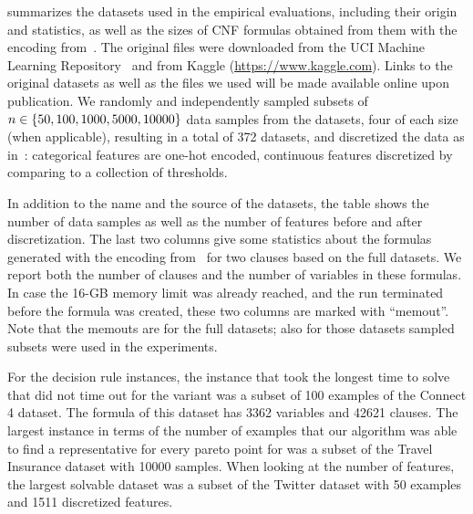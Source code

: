 
 summarizes the datasets used in the empirical evaluations, including their origin and statistics, as well as the sizes of CNF formulas obtained from them with the encoding from~\textcite{DBLP:conf/cp/MaliotovM18}.
The original files were downloaded from the UCI Machine Learning Repository~\autocite{UciMlr} and from Kaggle ({\small\url{https://www.kaggle.com}}).
Links to the original datasets as well as the files we used will be made available online upon publication.
We randomly and independently sampled subsets of $n\in\{50,100,1000,5000,10000\}$ data samples from the datasets, four of each size (when applicable), resulting in a         
total of 372 datasets, and discretized the data as in~\autocite{DBLP:conf/cp/MaliotovM18}:
categorical features are one-hot encoded, continuous features discretized by comparing to a collection of thresholds. 

In addition to the name and the source of the datasets, the table shows the number of data samples as well as the number of features before and after discretization.
The last two columns give some statistics about the formulas generated with the encoding from~\textcite{DBLP:conf/cp/MaliotovM18} for two clauses based on the full datasets.
We report both the number of clauses and the number of variables in these formulas.
In case the 16-GB memory limit was already reached, and the run terminated before the formula was created, these two columns are marked with ``memout''.
Note that the memouts are for the full datasets; also for those datasets sampled subsets were used in the experiments.

For the decision rule instances, the instance that took the longest time to solve that did not time out for the \msh{} variant was a subset of 100 examples of the Connect 4 dataset.
The formula of this dataset has 3362 variables and 42621 clauses.
The largest instance in terms of the number of examples that our algorithm was able to find a representative for every pareto point for was a subset of the Travel Insurance dataset with 10000 samples.
When looking at the number of features, the largest solvable dataset was a subset of the Twitter dataset with 50 examples and 1511 discretized features.

